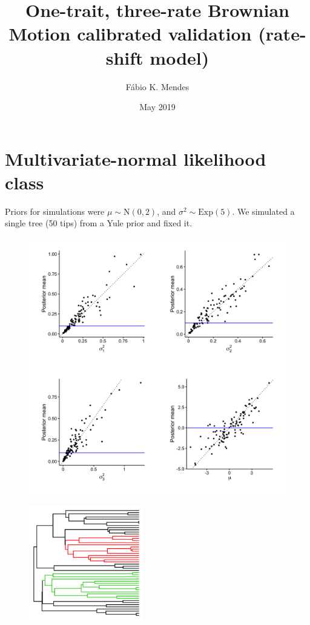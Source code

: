 \documentclass{article}
\title{One-trait, three-rate Brownian Motion calibrated validation
  (rate-shift model)}
\author{F\'{a}bio K. Mendes}
\date{May 2019}
\begin{document}
\maketitle

\newpage

\section{Multivariate-normal likelihood class}

Priors for simulations were $\mu \sim \text{N}(0, 2)$, and $\sigma^2 \sim \text{Exp}(5)$. We simulated a single tree (50 tips) from a Yule prior and fixed it.

\begin{figure}[h]
  \centering
  \includegraphics[width=12cm]{../BMMVNShiftThreeRates_ultra_graphs.png}
\end{figure}

\begin{figure}[h]
  \centering
  \includegraphics[width=5cm]{../BMMVNShiftThreeRates_ultra_tree.png}
\end{figure}
\end{document}
